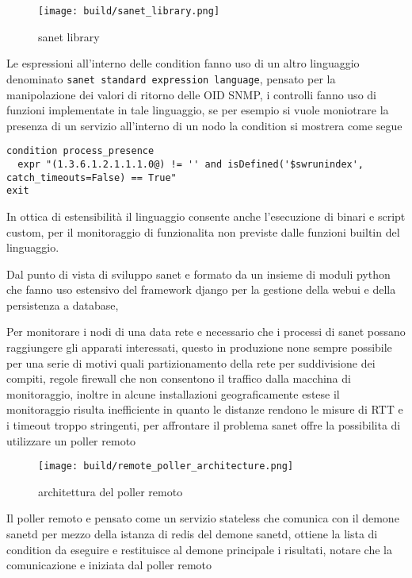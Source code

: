 \documentclass[12pt,a4paper,twoside,openright]{book}
\begin{document}
\begin{figure}[H]
    \centering
    \texttt{[image: build/sanet\_library.png]}
    \caption{sanet library}
    \label{fig:enter-label}
\end{figure}

Le espressioni all'interno delle condition fanno uso di un altro linguaggio denominato \verb|sanet standard expression language|, pensato per la manipolazione dei valori di ritorno delle OID SNMP, i controlli fanno uso di funzioni implementate in tale linguaggio, se per esempio si vuole moniotrare la presenza di un servizio all'interno di un nodo la condition si mostrera come segue

\begin{lstlisting}
condition process_presence
  expr "(1.3.6.1.2.1.1.1.0@) != '' and isDefined('$swrunindex', catch_timeouts=False) == True"
exit
\end{lstlisting}

In ottica di estensibilità il linguaggio consente anche l'esecuzione di binari e script custom, per il monitoraggio di funzionalita non previste dalle funzioni builtin del linguaggio.

Dal punto di vista di sviluppo sanet e formato da un insieme di moduli python che fanno uso estensivo del framework django per la gestione della webui e della persistenza a database,

Per monitorare i nodi di una data rete e necessario che i processi di sanet possano raggiungere gli apparati interessati, questo in produzione none sempre possibile per una serie di motivi quali partizionamento della rete per suddivisione dei compiti, regole firewall che non consentono il traffico dalla macchina di monitoraggio, inoltre in alcune installazioni geograficamente estese il monitoraggio risulta inefficiente in quanto le distanze rendono le misure di RTT e i timeout troppo stringenti, per affrontare il problema sanet offre la possibilita di utilizzare un poller remoto

\begin{figure}[H]
    \centering
    \texttt{[image: build/remote\_poller\_architecture.png]}
    \caption{architettura del poller remoto}
    \label{fig:enter-label}
\end{figure}

Il poller remoto e pensato come un servizio stateless che comunica con il demone sanetd per mezzo della istanza di redis del demone sanetd, ottiene la lista di condition da eseguire e restituisce al demone principale i risultati, notare che la comunicazione e iniziata dal poller remoto
\end{document}
